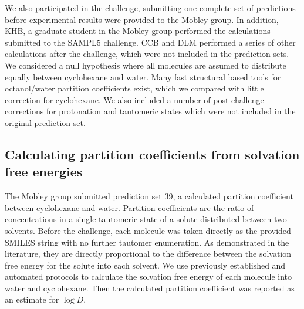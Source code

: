 
We also participated in the challenge, submitting one complete set of predictions before experimental results were provided to the Mobley group. %
In addition, KHB, a graduate student in the Mobley group performed the calculations submitted to the SAMPL5 challenge. 
CCB and DLM performed a series of other calculations after the challenge, which were not included in the prediction sets. 
We considered a null hypothesis where all molecules are assumed to distribute equally between cyclohexane and water.
Many fast structural based tools for octanol/water partition coefficients exist, which we compared with little correction for cyclohexane. 
We also included a number of post challenge corrections for protonation and tautomeric states which were not included in the original prediction set. 

\subsection{Calculating partition coefficients from solvation free energies}
\label{methods:2}
The Mobley group submitted prediction set 39, a calculated partition coefficient between cyclohexane and water. %
Partition coefficients are the ratio of concentrations in a single tautomeric state of a solute distributed between two solvents. 
Before the challenge, each molecule was taken directly as the provided SMILES string with no further tautomer enumeration.
As demonstrated in the literature, %
they are directly proportional to the difference between the solvation free energy for the solute into each solvent. %
We use previously established and automated protocols %
to calculate the solvation free energy of each molecule into water and cyclohexane. 
Then the calculated partition coefficient was reported as an estimate for $\log D$. 

